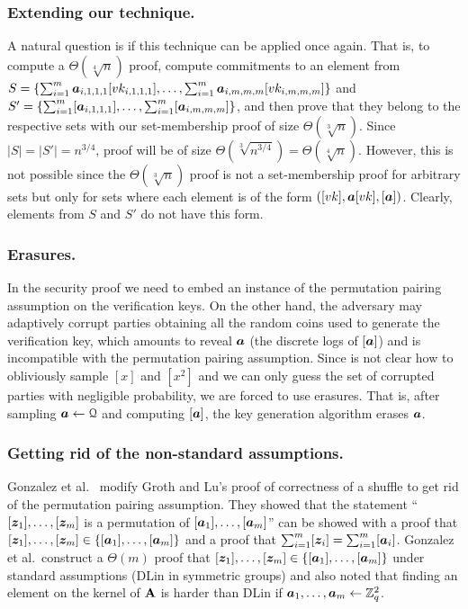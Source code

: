 \subsubsection{Extending our technique.}
A natural question is if this technique can be applied once again. That is, to compute a $\Theta(\sqrt[4]{n})$  proof, compute commitments to an element from $S=\{\sum_{i=1}^{m}{\boldsymbol{a}}_{i,1,1,1}[vk_{i,1,1,1}],\ldots,\sum_{i=1}^{m}{\boldsymbol{a}}_{i,m,m,m}[vk_{i,m,m,m}]\}$ and $S'=\allowbreak\{\sum_{i=1}^{m}[{\boldsymbol{a}}_{i,1,1,1}],\ldots,\sum_{i=1}^{m}[{\boldsymbol{a}}_{i,m,m,m}]\}$, and then prove that they belong to the respective sets with our set-membership proof of size $\Theta(\sqrt[3]{n})$. Since $|S|=|S'|=n^{3/4}$, proof will be of size $\Theta(\sqrt[3]{n^{3/4}})=\Theta(\sqrt[4]{n})$. However, this is not possible since the $\Theta(\sqrt[3]{n})$ proof is not a set-membership proof for arbitrary sets but only for sets where each element is of the form $([vk],{\boldsymbol{a}}[vk],[{\boldsymbol{a}}])$. Clearly, elements from $S$ and $S'$ do not have this form.


\subsubsection{Erasures.}
In the security proof we need to embed an instance of the permutation pairing assumption on the verification keys. On the other hand, the adversary may adaptively corrupt parties obtaining all the random coins used to generate the verification key, which amounts to reveal ${\boldsymbol{a}}$ (the discrete logs of $[{\boldsymbol{a}}]$) and is incompatible with the permutation pairing assumption. Since is not clear how to obliviously sample $[x]$ and $[x^{2}]$ and we can only guess the set of corrupted parties with negligible probability, we are forced to use erasures. That is, after sampling ${\boldsymbol{a}}\gets\mathcal{Q}$ and computing $[{\boldsymbol{a}}]$, the key generation algorithm erases ${\boldsymbol{a}}$.

\subsubsection{Getting rid of the non-standard assumptions.} Gonzalez et al.~\cite{ACNS:GonRaf16} modify Groth and Lu's proof of correctness of a shuffle \cite{AC:GroLu07} to get rid of the permutation pairing assumption. They showed that the statement ``$[{\boldsymbol{z}}_1],\ldots,[{\boldsymbol{z}}_m]$ is a permutation of $[{\boldsymbol{a}}_1],\ldots,[{\boldsymbol{a}}_m]$'' can be showed with a proof that $[{\boldsymbol{z}}_1],\ldots,[{\boldsymbol{z}}_m]\in\{[{\boldsymbol{a}}_1],\ldots,[{\boldsymbol{a}}_m]\}$ and a proof that $\sum_{i=1}^m [{\boldsymbol{z}}_i]=\sum_{i=1}^m [{\boldsymbol{a}}_i]$.  Gonzalez et al.~construct a $\Theta(m)$ proof that $[{\boldsymbol{z}}_1],\ldots,[{\boldsymbol{z}}_m]\in\{[{\boldsymbol{a}}_1],\ldots,[{\boldsymbol{a}}_m]\}$ under standard assumptions (DLin in symmetric groups)  and also noted that finding an element on the kernel of $\mathbf{{A}}$ is harder than DLin if ${\boldsymbol{a}}_1,\ldots,{\boldsymbol{a}}_m\gets\mathbb{Z}_q^2$.

